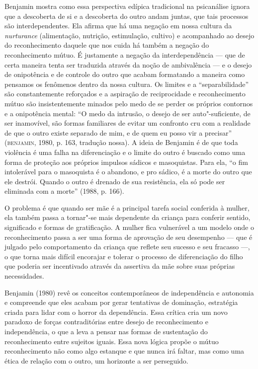 Benjamin mostra como essa perspectiva edípica tradicional na psicanálise
ignora que a descoberta de si e a descoberta do outro andam juntas, que
tais processos são interdependentes. Ela afirma que há uma negação em
nossa cultura da \emph{nurturance} (alimentação, nutrição, estimulação,
cultivo) e acompanhado ao desejo do reconhecimento daquele que nos cuida
há também a negação do reconhecimento mútuo. É justamente a negação da
interdependência --- que de certa maneira tenta ser traduzida através da
noção de ambivalência --- e o desejo de onipotência e de controle do
outro que acabam formatando a maneira como pensamos os fenômenos dentro
da nossa cultura. Os limites e a ``separabilidade'' são constantemente
reforçados e a aspiração de reciprocidade e reconhecimento mútuo são
insistentemente minados pelo medo de se perder os próprios contornos e a
onipotência mental: ``O medo da intrusão, o desejo de ser
auto"-suficiente, de ser inamovível, são formas familiares de evitar um
confronto cru com a realidade de que o outro existe separado de mim, e
de quem eu posso vir a precisar'' (\textsc{benjamin}, 1980, p. 163, tradução
nossa). A ideia de Benjamin é de que toda violência é uma falha na
diferenciação e o limite do outro é buscado como uma forma de proteção
aos próprios impulsos sádicos e masoquistas. Para ela, ``o fim
intolerável para o masoquista é o abandono, e pro sádico, é a morte do
outro que ele destrói. Quando o outro é drenado de sua resistência, ela
só pode ser eliminada com a morte'' (1988, p. 166).

O problema é que quando ser mãe é a principal tarefa social conferida à
mulher, ela também passa a tornar"-se mais dependente da criança para
conferir sentido, significado e formas de gratificação. A mulher fica
vulnerável a um modelo onde o reconhecimento passa a ser uma forma de
aprovação de seu desempenho --- que é julgado pelo comportamento da
criança que reflete seu sucesso e seu fracasso ---, o que torna mais
difícil encorajar e tolerar o processo de diferenciação do filho que
poderia ser incentivado através da assertiva da mãe sobre suas próprias
necessidades.

Benjamin (1980) revê os conceitos contemporâneos de independência e
autonomia e compreende que eles acabam por gerar tentativas de dominação,
estratégia criada para lidar com o horror da dependência. Essa crítica
cria um novo paradoxo de forças contraditórias entre desejo de
reconhecimento e independência, o que a leva a pensar nas formas de
sustentação do reconhecimento entre sujeitos iguais. Essa nova lógica
propõe o mútuo reconhecimento não como algo estanque e que nunca irá
faltar, mas como uma ética de relação com o outro, um horizonte a ser
perseguido.

